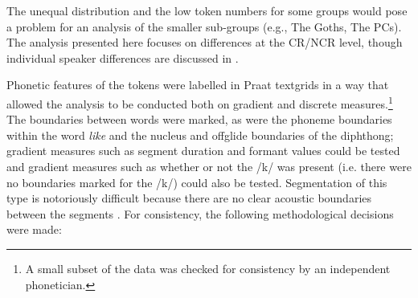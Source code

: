 The unequal distribution and the low token numbers for some groups would pose a problem for an analysis of the smaller sub-groups (e.g., The Goths, The PCs). The analysis presented here focuses on differences at the CR/NCR level, though individual speaker differences are discussed in .  

Phonetic features of the tokens were la\-belled in Praat text\-grids \citep{boersmaweenink} in a way that allowed the analysis to be conducted both on gradient and discrete measures.\footnote{A small subset of the data was checked for consistency by an independent phonetician.} The bound\-aries be\-tween words were marked, as were the phoneme boundaries within the word \textit{like} and the nucleus and offglide boundaries of the diphthong; gradient measures such as segment duration and formant values could be tested and gradient measures such as whether or not the /k/ was present (i.e. there were no boundaries marked for the /k/) could also be tested. Segmentation of this type is notoriously difficult because there are no clear acoustic boundaries between the segments \citep[142]{ladefoged2003}. For consistency, the following methodological decisions were made:

